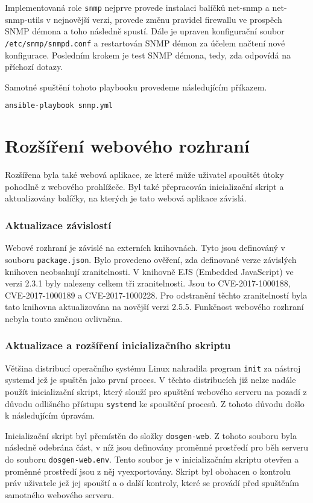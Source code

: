 Implementovaná role \texttt{snmp} nejprve provede instalaci balíčků net-snmp a net-snmp-utils v nejnovější verzi, provede změnu pravidel firewallu ve prospěch SNMP démona a toho následně spustí. Dále je upraven konfigurační soubor \texttt{/etc/snmp/snmpd.conf} a restartován SNMP démon za účelem načtení nové konfigurace. Posledním krokem je test SNMP démona, tedy, zda odpovídá na příchozí dotazy.

Samotné spuštění tohoto playbooku provedeme následujícím příkazem.

\begin{lstlisting}[language=bash]
ansible-playbook snmp.yml
\end{lstlisting}

\section{Rozšíření webového rozhraní}
Rozšířena byla také webová aplikace, ze které může uživatel spouštět útoky pohodlně z webového prohlížeče. Byl také přepracován inicializační skript a aktualizovány balíčky, na kterých je tato webová aplikace závislá.

\subsubsection{Aktualizace závislostí}
Webové rozhraní je závislé na externích knihovnách. Tyto jsou definováný v souboru \texttt{package.json}. Bylo provedeno ověření, zda definované verze závislých knihoven neobsahují zranitelnosti. V knihovně EJS (Embedded JavaScript) ve verzi 2.3.1 byly nalezeny celkem tři zranitelnosti. Jsou to CVE-2017-1000188, CVE-2017-1000189 a CVE-2017-1000228. Pro odstranění těchto zranitelností byla tato knihovna aktualizována na novější verzi 2.5.5. Funkčnost webového rozhraní nebyla touto změnou ovlivněna.

\subsubsection{Aktualizace a rozšíření inicializačního skriptu}
Většina distribucí operačního systému Linux nahradila program \texttt{init} za nástroj systemd jež je spuštěn jako první proces. V těchto distribucích již nelze nadále použít inicializační skript, který slouží pro spuštění webového serveru na pozadí z důvodu odlišného přístupu \texttt{systemd} ke spouštění procesů. Z tohoto důvodu došlo k následujícím úpravám.

Inicializační skript byl přemístěn do složky \texttt{dosgen-web}. Z tohoto souboru byla následně odebrána část, v níž jsou definovány proměnné prostředí pro běh serveru do souboru \texttt{dosgen-web.env}. Tento soubor je v inicializačním skriptu otevřen a proměnné prostředí jsou z něj vyexportovány. Skript byl obohacen o kontrolu práv uživatele jež jej spouští a o další kontroly, které se provádí před spuštěním samotného webového serveru.

